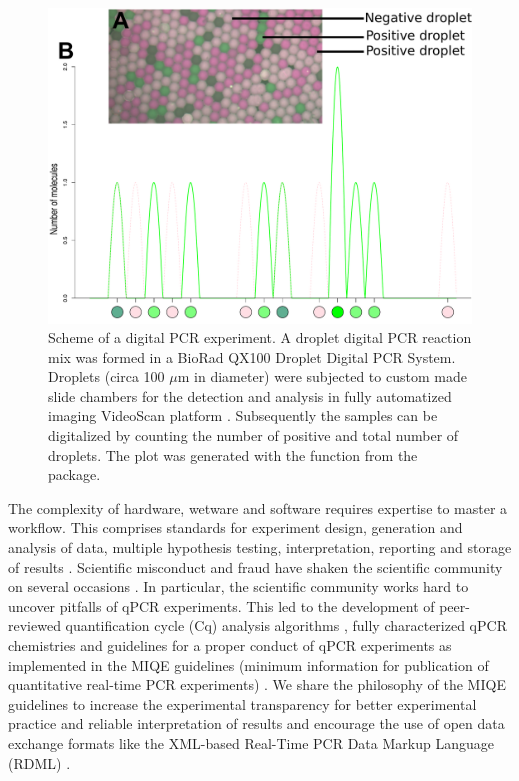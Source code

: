 \begin{figure}[htbp]
  \centering
  \includegraphics[clip=true,trim=0.1cm 0.3cm 0.2cm 0.1cm, width=12cm]{figures/dpcR_sim.pdf} \caption{Scheme 
of a digital PCR experiment.  A droplet digital PCR reaction 
mix was formed in a BioRad QX100 Droplet Digital PCR System. Droplets (circa 
100 $\mu$m in diameter) were subjected to custom made slide chambers for the 
detection and analysis in fully automatized imaging VideoScan platform 
\citep{rodiger_highly_2013}.  Subsequently the samples can be 
digitalized by counting the number of positive and total number of droplets. The 
plot was generated with the  function from the  
package.}
\label{figure:dpcR_sim}
\end{figure}

The complexity of hardware, wetware and software requires expertise to master a 
workflow. This comprises standards for experiment design, generation and 
analysis of data, multiple hypothesis testing, interpretation, reporting and 
storage of results \citep{huggett_BDQ_2014, conde_2014}. Scientific misconduct 
and fraud have shaken the scientific community on several occasions 
\citep{bustin_2014}. In particular, the scientific community works hard to 
uncover pitfalls of qPCR experiments. This led to the development of 
peer-reviewed quantification cycle (Cq) analysis algorithms 
\citep{ruijter_2013}, fully characterized qPCR chemistries \citep{ruijter_2014} 
and guidelines for a proper conduct of qPCR experiments as implemented in the 
MIQE guidelines (minimum information for publication of quantitative real-time 
PCR experiments) \citep{huggett_2013, bustin_2014}. We share the philosophy of 
the MIQE guidelines to increase the experimental transparency for better 
experimental practice and reliable interpretation of results and encourage the 
use of open data exchange formats like the XML-based Real-Time PCR Data Markup 
Language (RDML) \citep{lefever_2009}.

